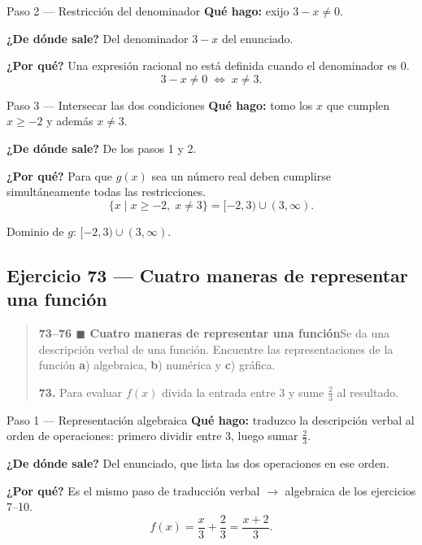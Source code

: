 \documentclass[11pt]{article}
\begin{document}
\begin{paso}{Paso 2 --- Restricción del denominador}
\textbf{Qué hago:} exijo $3-x\ne0$.

\textbf{¿De dónde sale?} Del denominador $3-x$ del enunciado.

\textbf{¿Por qué?} Una expresión racional no está definida cuando el denominador es 0.
\[
3-x\ne 0 \;\Longleftrightarrow\; x\ne 3.
\]
\end{paso}

\begin{paso}{Paso 3 --- Intersecar las dos condiciones}
\textbf{Qué hago:} tomo los $x$ que cumplen $x\ge-2$ y además $x\ne3$.

\textbf{¿De dónde sale?} De los pasos 1 y 2.

\textbf{¿Por qué?} Para que $g(x)$ sea un número real deben cumplirse simultáneamente todas las restricciones.
\[
\{x \mid x\ge -2,\; x\ne 3\}=[-2,3)\cup(3,\infty).
\]
\end{paso}

\begin{resp}
Dominio de $g$: $[-2,3)\cup(3,\infty)$.
\end{resp}

\subsection*{Ejercicio 73 — Cuatro maneras de representar una función}

\begin{quote}
\textbf{73--76 $\blacksquare$ Cuatro maneras de representar una función}\quad Se da una descripción verbal de una función. Encuentre las representaciones de la función \textbf{a}) algebraica, \textbf{b}) numérica y \textbf{c}) gráfica.

\textbf{73.} Para evaluar $f(x)$ divida la entrada entre 3 y sume $\tfrac23$ al resultado.
\end{quote}

\begin{paso}{Paso 1 --- Representación algebraica}
\textbf{Qué hago:} traduzco la descripción verbal al orden de operaciones: primero dividir entre 3, luego sumar $\tfrac23$.

\textbf{¿De dónde sale?} Del enunciado, que lista las dos operaciones en ese orden.

\textbf{¿Por qué?} Es el mismo paso de traducción verbal $\to$ algebraica de los ejercicios 7--10.
\[
f(x)=\frac{x}{3}+\frac23=\frac{x+2}{3}.
\]
\end{paso}
\end{document}
